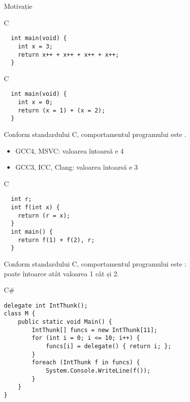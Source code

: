 \documentclass[xcolor=pdftex,romanian,colorlinks]{beamer}
\begin{document}
\begin{section}{Motivație}
\begin{frame}[fragile]{C}
\begin{block}{}
\begin{verbatim}
  int main(void) {
    int x = 3;
    return x++ + x++ + x++ + x++;
  }
\end{verbatim}
\end{block}
\end{frame}

\begin{frame}[fragile]{C}

\begin{block}{}
\begin{verbatim}
  int main(void) {
    int x = 0;
    return (x = 1) + (x = 2);
  }
\end{verbatim}
\end{block}
Conform standardului C, comportamentul programului este .
\begin{itemize}
\item GCC4, MSVC: valoarea întoarsă e \alert{4}
\item GCC3, ICC, Clang: valoarea întoarsă e \alert{3}
\end{itemize}
\end{frame}

\begin{frame}[fragile]{C}

\begin{block}{}
\begin{verbatim}
  int r; 
  int f(int x) {
    return (r = x);
  }
  int main() {
    return f(1) + f(2), r;
  }
\end{verbatim}
\end{block}

 Conform standardului C, comportamentul programului este :\\
poate întoarce atât valoarea \alert{1} cât și \alert{2}.
\end{frame}

\begin{frame}[fragile]{C\#}
\begin{verbatim}
delegate int IntThunk();
class M {
    public static void Main() {
        IntThunk[] funcs = new IntThunk[11];
        for (int i = 0; i <= 10; i++) {
            funcs[i] = delegate() { return i; };
        }
        foreach (IntThunk f in funcs) {
            System.Console.WriteLine(f());
        }
    }
}
\end{verbatim}
\end{frame}



\end{section}
\end{document}
